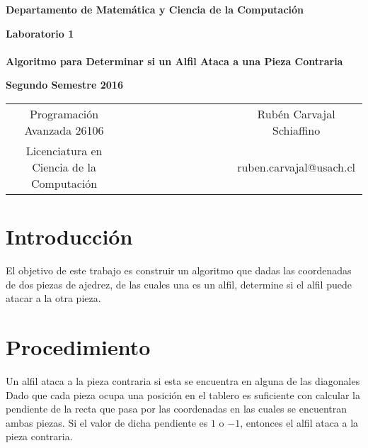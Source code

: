 \documentclass{report}
\begin{document}
\begin{titlepage}
\begin{center}
\end{center}
\begin{center}
{\bf Departamento de Matem\'atica y Ciencia de la Computaci\'on}
\end{center}
\vspace{3cm}
\begin{center}
%
%
{\Large \bf Laboratorio 1 \\
~~ \\
Algoritmo para Determinar si un Alfil Ataca a una Pieza Contraria}
%
%
\end{center}
\begin{center}
%
%
%
{\large \bf Segundo Semestre 2016}
%
%
\end{center}
\vspace{5cm}
\begin{tabular}{c l c}
%
%
%
Programaci\'on Avanzada 26106 & ~~~~~~~~~~~~~~~~~ & Rub\'en Carvajal Schiaffino \\
%
%
%
Licenciatura en Ciencia de la Computaci\'on & ~~ & ruben.carvajal@usach.cl 
%
%
\end{tabular}
\end{titlepage}
%
\section{Introducci\'on}
El objetivo de este trabajo es construir un algoritmo que dadas las coordenadas de dos piezas de ajedrez, de las 
cuales una es un alfil, determine si el alfil puede atacar a la otra pieza.
%
\section{Procedimiento}
Un alfil ataca a la pieza contraria si esta se encuentra en alguna de las diagonales 
Dado que cada pieza ocupa una posici\'on en el tablero es suficiente con calcular la pendiente de la recta que pasa 
por las coordenadas en las cuales se encuentran ambas piezas. 
\newline
\newline
Si el valor de dicha pendiente es $1$ o $-1$, entonces el alfil ataca a la pieza contraria.    
%
\end{document}
